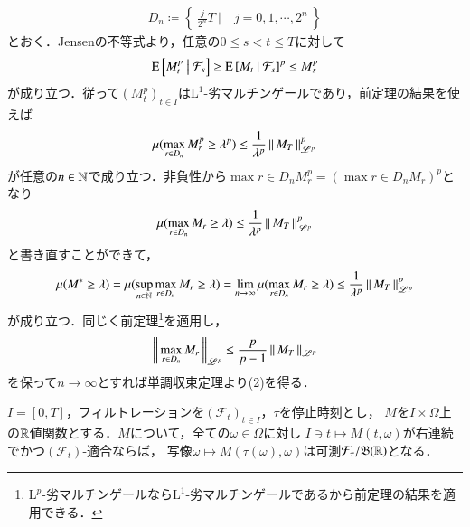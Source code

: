 	\begin{prf}
		\begin{align}
			D_n \coloneqq \left\{\ \tfrac{j}{2^n}T\ |\quad j=0,1,\cdots,2^n\ \right\}
		\end{align}
		とおく．Jensenの不等式より，任意の$0 \leq s < t \leq T$に対して
		\begin{align}
			\operatorname{E} \left[ M_t^p \ \middle|\ \mathcal{F}_s \right] \geq \operatorname{E} \left[ M_t \ \middle|\ \mathcal{F}_s \right]^p \leq M_s^p
		\end{align}
		が成り立つ．従って$(M_t^p)_{t \in I}$は$\mathrm{L}^1$-劣マルチンゲールであり，前定理の結果を使えば
		\begin{align}
			\mu(\operatorname*{max}_{r \in D_n} M_r^p \geq \lambda^p) \leq \frac{1}{\lambda^p} \left\|\, M_T\, \right\|_{\mathscr{L}^p}^p
		\end{align}
		が任意の$n \in \mathbb{N}$で成り立つ．非負性から$\max{r \in D_n}{M_r^p} = (\max{r \in D_n}{M_r})^p$となり
		\begin{align}
			\mu(\operatorname*{max}_{r \in D_n} M_r \geq \lambda) \leq \frac{1}{\lambda^p} \left\|\, M_T\, \right\|_{\mathscr{L}^p}^p
		\end{align}
		と書き直すことができて，
		\begin{align}
			\mu(M^* \geq \lambda) 
			= \mu(\operatorname*{sup}_{n \in \mathbb{N}} \operatorname*{max}_{r \in D_n} M_r \geq \lambda)
			= \lim_{n \to \infty} \mu(\operatorname*{max}_{r \in D_n} M_r \geq \lambda) \leq \frac{1}{\lambda^p} \left\|\, M_T\, \right\|_{\mathscr{L}^p}^p
		\end{align}
		が成り立つ．同じく前定理\footnote{$\mathrm{L}^p$-劣マルチンゲールなら$\mathrm{L}^1$-劣マルチンゲールであるから前定理の結果を適用できる．}を適用し，
		\begin{align}
			\left\|\, \operatorname*{max}_{r \in D_n} M_r\, \right\|_{\mathscr{L}^p} \leq \frac{p}{p-1} \left\|\, M_T\, \right\|_{\mathscr{L}^p}
		\end{align}
		を保って$n \longrightarrow \infty$とすれば単調収束定理より(2)を得る．
		\QED
	\end{prf}
	
	\begin{itembox}[l]{}
		\begin{thm}[停止時刻との合成写像の可測性]
			$I = [0,T]$，フィルトレーションを$(\mathcal{F}_t)_{t \in I}$，$\tau$を停止時刻とし，
			$M$を$I \times \Omega$上の$\mathbb{R}$値関数とする．$M$について，全ての$\omega \in \Omega$に対し
			$I \ni t \longmapsto M(t,\omega)$が右連続でかつ$(\mathcal{F}_t)$-適合ならば，
			写像$\omega \longmapsto M(\tau(\omega),\omega)$は可測$\mathcal{F}_\tau/\mathfrak{B}(\mathbb{R})$となる．
		\end{thm}
	\end{itembox}
	
